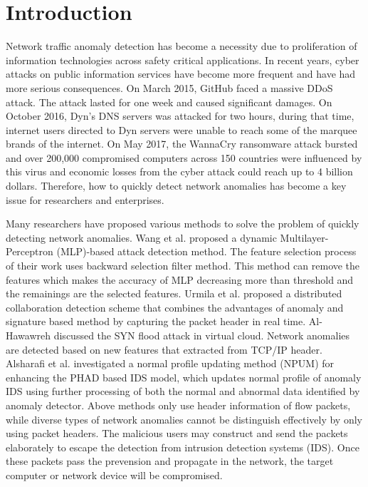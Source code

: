\documentclass{ieeeaccess}
\theoremstyle{definition}
\begin{document}
\maketitle

\section{Introduction}
\label{sec:introduction}
Network traffic anomaly detection has become a necessity due to proliferation of information technologies across safety critical applications. In recent years, cyber attacks on public information services have become more frequent and have had more serious consequences.
On March 2015, GitHub faced a massive DDoS attack. The attack lasted for one week and caused significant damages\cite{github-2015}. On October 2016, Dyn's DNS servers was attacked for two hours, during that time, internet users directed to Dyn servers were unable to reach some of the marquee brands of the internet\cite{dyn-2016}. On May 2017, the WannaCry ransomware attack bursted and over 200,000 compromised computers across 150 countries were influenced by this virus and economic losses from the cyber attack could reach up to 4 billion dollars\cite{wannacry-2017}.
Therefore, how to quickly detect network anomalies has become a key issue for researchers and enterprises.

Many researchers have proposed various methods to solve the problem of quickly detecting network anomalies.
Wang et al.\cite{Wang2020CS} proposed a dynamic Multilayer-Perceptron (MLP)-based attack detection method. The feature selection process of their work uses backward selection filter method. This method can remove the features which makes the accuracy of MLP decreasing more than threshold and the remainings are the selected features. Urmila et al.\cite{Urmila2017} proposed a distributed collaboration detection scheme that combines the advantages of anomaly and signature based method by capturing the packet header in real time. Al-Hawawreh\cite{MunaSulieman2017} discussed the SYN flood attack in virtual cloud. Network anomalies are detected based on new features that extracted from TCP/IP header. Alsharafi et al.\cite{Alsharafi2020} investigated a normal profile updating method (NPUM) for enhancing the PHAD based IDS model, which updates normal profile of anomaly IDS using further processing of both the normal and abnormal data identified by anomaly detector. 
Above methods only use header information of flow packets, while diverse types of network anomalies cannot be distinguish effectively by only using packet headers. The malicious users may construct and send the packets elaborately to escape the detection from intrusion detection systems (IDS). Once these packets pass the prevension and propagate in the network, the target computer or network device will be compromised.
\end{document}
